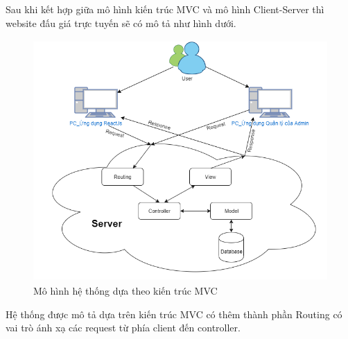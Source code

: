 \documentclass{article}
\begin{document}
Sau khi kết hợp giữa mô hình kiến trúc MVC và mô hình Client-Server thì website đấu giá trực tuyến sẽ có mô tả như hình dưới. 
\begin{figure}[H]
    \centering
    \includegraphics[width=11.4cm,height=9.22cm]{images/server.png}
    \caption{Mô hình hệ thống dựa theo kiến trúc MVC}
    \label{hinh42}
\end{figure}
Hệ thống được mô tả dựa trên kiến trúc MVC có thêm thành phần Routing có vai trò ánh xạ các request từ phía client đến controller.
\end{document}

